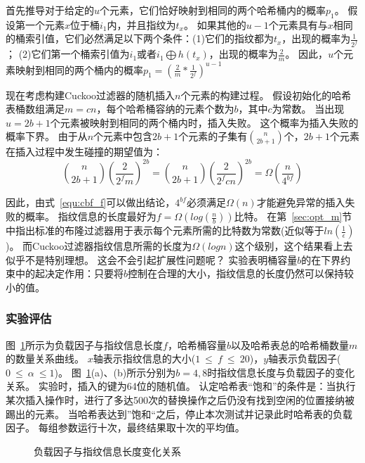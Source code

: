 首先推导对于给定的$u$个元素，它们恰好映射到相同的两个哈希桶内的概率$p_1$。
假设第一个元素$x$位于桶$i_1$内，并且指纹为$t_x$。
如果其他的$u-1$个元素具有与$x$相同的桶索引值，它们必然满足以下两个条件：(1)它们的指纹都为$t_x$，出现的概率为$\frac{1}{2^f}$；
(2)它们第一个桶索引值为$i_1$或者$i_1 \bigoplus h(t_x)$，出现的概率为$\frac{2}{m}$。
因此，$u$个元素映射到相同的两个桶内的概率$p_1 = (\frac{2}{m}\ast \frac{1}{2^f})^{u-1}$

现在考虑构建Cuckoo过滤器的随机插入$n$个元素的构建过程。
假设初始化的哈希表桶数组满足$m = cn$，每个哈希桶容纳的元素个数为$b$，其中$c$为常数。
当出现$u = 2b+1$个元素被映射到相同的两个桶内时，插入失败。
这个概率为插入失败的概率下界。
由于从$n$个元素中包含$2b+1$个元素的子集有$\binom{n}{2b+1}$个，$2b+1$个元素在插入过程中发生碰撞的期望值为：
\begin{equation}
\binom{n}{2b+1}(\frac{2}{2^fm})^{2b} = \binom{n}{2b+1}(\frac{2}{2^f{cn}})^{2b} = \Omega(\frac{n}{4^{bf}}) 
\label{equ:cbf_f}
\end{equation}

因此，由式~\ref{equ:cbf_f}可以做出结论，$4^{bf}$必须满足$\Omega(n)$才能避免异常的插入失败的概率。
指纹信息的长度最好为$f = \Omega(log(\frac{n}{b}))$比特。
在第~\ref{sec:opt_m}节中指出标准的布隆过滤器用于表示每个元素所需的比特数为常数(近似等于$ln(\frac{1}{\epsilon})$)。
而Cuckoo过滤器指纹信息所需的长度为$\Omega(logn)$这个级别，这个结果看上去似乎不是特别理想。
这会不会引起扩展性问题呢？
实验表明桶容量$b$的在下界约束中的起决定作用：只要将$b$控制在合理的大小，指纹信息的长度仍然可以保持较小的值。

\subsubsection{实验评估}
图~\ref{fig:cbf_fingerprint_size}所示为负载因子与指纹信息长度$f$，哈希桶容量$b$以及哈希表总的哈希桶数量$m$的数量关系曲线。
$x$轴表示指纹信息的大小($1~\leq ~f~\leq ~20$)，$y$轴表示负载因子($0~\leq ~\alpha ~\leq 1$)。
图~\ref{fig:cbf_fingerprint_size}(a)、(b)所示分别为$b = 4,8$时指纹信息长度与负载因子的变化关系。
实验时，插入的键为64位的随机值。
认定哈希表“饱和”的条件是：当执行某次插入操作时，进行了多达500次的替换操作之后仍没有找到空闲的位置接纳被踢出的元素。
当哈希表达到”饱和“之后，停止本次测试并记录此时哈希表的负载因子。
每组参数运行十次，最终结果取十次的平均值。
\begin{figure}[htbp]
\centering
{}
\caption{负载因子与指纹信息长度变化关系}
\label{fig:cbf_fingerprint_size}
\end{figure}

